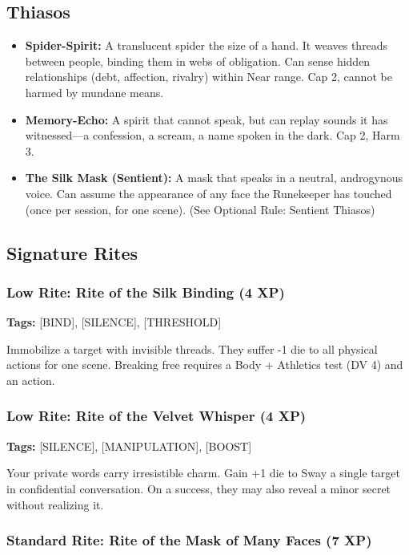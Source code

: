 \subsection{Thiasos}

\begin{itemize}
\item \textbf{Spider-Spirit:} A translucent spider the size of a hand. It weaves threads between people, binding them in webs of obligation. Can sense hidden relationships (debt, affection, rivalry) within Near range. Cap 2, cannot be harmed by mundane means.
\item \textbf{Memory-Echo:} A spirit that cannot speak, but can replay sounds it has witnessed—a confession, a scream, a name spoken in the dark. Cap 2, Harm 3.
\item \textbf{The Silk Mask (Sentient):} A mask that speaks in a neutral, androgynous voice. Can assume the appearance of any face the Runekeeper has touched (once per session, for one scene). (See Optional Rule: Sentient Thiasos)
\end{itemize}

\subsection{Signature Rites}

\subsubsection{Low Rite: Rite of the Silk Binding (4 XP)}

\textbf{Tags:} [BIND], [SILENCE], [THRESHOLD]

Immobilize a target with invisible threads. They suffer -1 die to all physical actions for one scene. Breaking free requires a Body + Athletics test (DV 4) and an action.

\subsubsection{Low Rite: Rite of the Velvet Whisper (4 XP)}

\textbf{Tags:} [SILENCE], [MANIPULATION], [BOOST]

Your private words carry irresistible charm. Gain +1 die to Sway a single target in confidential conversation. On a success, they may also reveal a minor secret without realizing it.

\subsubsection{Standard Rite: Rite of the Mask of Many Faces (7 XP)}

